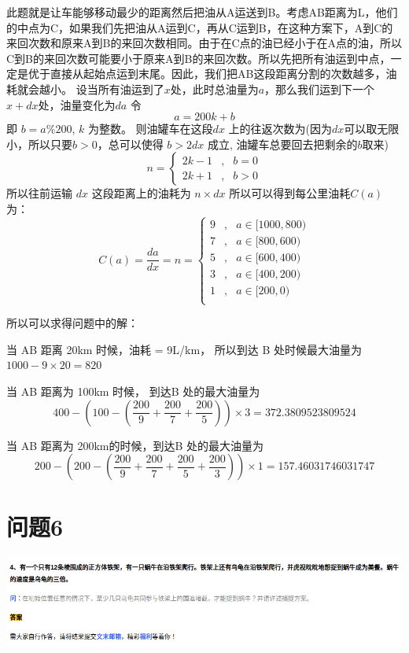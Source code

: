 \documentclass{article}
\begin{document}
此题就是让车能够移动最少的距离然后把油从A运送到B。考虑AB距离为L，他们的中点为C，如果我们先把油从A运到C，再从C运到B，在这种方案下，A到C的来回次数和原来A到B的来回次数相同。由于在C点的油已经小于在A点的油，所以C到B的来回次数可能要小于原来A到B的来回次数。所以先把所有油运到中点，一定是优于直接从起始点运到末尾。因此，我们把AB这段距离分割的次数越多，油耗就会越小。
设当所有油运到了$x$处，此时总油量为$a$，那么我们运到下一个$x+dx$处，油量变化为$da$
令 
$$ a = 200k+ b $$
即 $ b = a \% 200 $, $k$ 为整数。
则油罐车在这段$ dx $ 上的往返次数为(因为$dx$可以取无限小，所以只要$b > 0$，总可以使得 $b > 2dx$ 成立, 油罐车总要回去把剩余的$b$取来)
$$ 
n = \left\{
    \begin{aligned}
        2k - 1 & , & b = 0 \\
        2k + 1 & , & b > 0 
    \end{aligned}
\right.
$$
所以往前运输 $dx$ 这段距离上的油耗为 $n \times dx$ 所以可以得到每公里油耗$C(a)$为：
$$
C(a) = \frac{da}{dx} = n = 
\left\{
    \begin{aligned}
        9 & , & a \in [1000, 800) \\
        7 & , & a \in [800, 600) \\ 
        5 & , & a \in [600, 400) \\
        3 & , & a \in [400, 200) \\
        1 & , & a \in [200, 0) \\
    \end{aligned}
\right.
$$

所以可以求得问题中的解：


当 AB 距离 20km 时候，油耗 = 9L/km， 所以到达 B 处时候最大油量为 $1000 - 9 \times 20 = 820$

当 AB 距离为 100km 时候， 到达B 处的最大油量为
$$ 
400 - (100 - (\frac{200}{9} + \frac{200}{7} + \frac{200}{5})) \times 3 = 372.3809523809524
$$


当 AB 距离为 200km的时候，到达B 处的最大油量为
$$
200 - (200 - (\frac{200}{9} + \frac{200}{7} + \frac{200}{5} + \frac{200}{3})) \times 1 = 157.46031746031747
$$

\newpage
\section{问题6}
\includegraphics[scale=0.5]{turtle.png}
\end{document}
